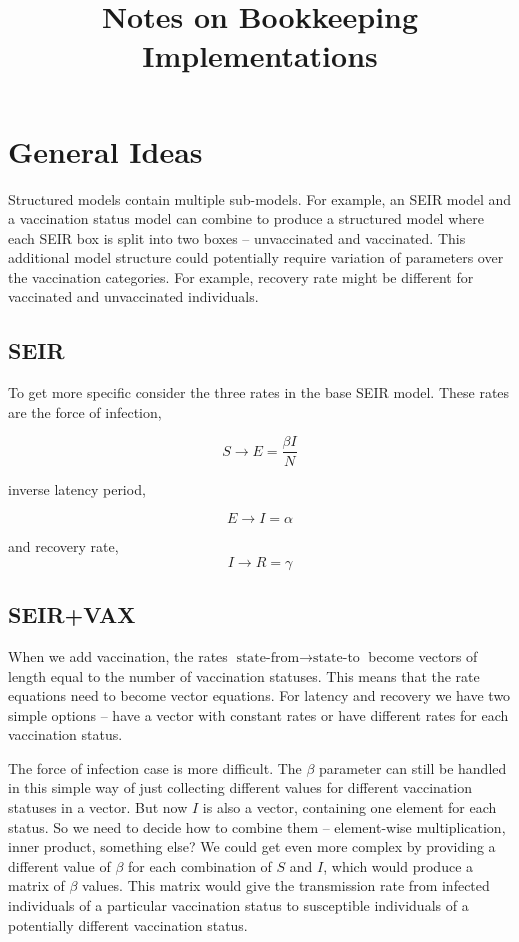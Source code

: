 \documentclass{article}
\title{Notes on Bookkeeping Implementations}
\theoremstyle{definition}
\begin{document}
\maketitle
\section{General Ideas}

Structured models contain multiple sub-models. For example, an SEIR model and a vaccination status model can combine to produce a structured model where each SEIR box is split into two boxes -- unvaccinated and vaccinated. This additional model structure could potentially require variation of parameters over the vaccination categories. For example, recovery rate might be different for vaccinated and unvaccinated individuals.

\subsection{SEIR}

To get more specific consider the three rates in the base SEIR model. These rates are the force of infection,

$$
S \rightarrow E = \frac{\beta I}{N}
$$

inverse latency period,

$$
E \rightarrow I = \alpha
$$

and recovery rate,
$$
I \rightarrow R = \gamma
$$

\subsection{SEIR+VAX}

When we add vaccination, the rates $\text{state-from} \rightarrow \text{state-to}$ become vectors of length equal to the number of vaccination statuses. This means that the rate equations need to become vector equations.  For latency and recovery we have two simple options -- have a vector with constant rates or have different rates for each vaccination status.

The force of infection case is more difficult. The $\beta$ parameter can still be handled in this simple way of just collecting different values for different vaccination statuses in a vector. But now $I$ is also a vector, containing one element for each status. So we need to decide how to combine them -- element-wise multiplication, inner product, something else? We could get even more complex by providing a different value of $\beta$ for each combination of $S$ and $I$, which would produce a matrix of $\beta$ values. This matrix would give the transmission rate from infected individuals of a particular vaccination status to susceptible individuals of a potentially different vaccination status.
\end{document}
